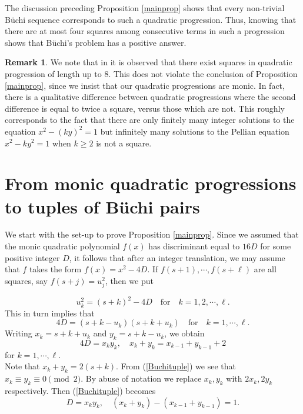 \documentclass[letterpaper,10pt]{amsart}
\theoremstyle{definition}
\newtheorem{remark}[theorem]{Remark}
\numberwithin{equation}{section}
\begin{document}
The discussion preceding Proposition \ref{mainprop} shows that every non-trivial B\"{u}chi sequence corresponds to such a quadratic progression. Thus, knowing that there are at most four squares among consecutive terms in such a progression shows that B\"{u}chi's problem has a positive answer. 

\begin{remark} We note that in \cite{Pin} it is observed that there exist squares in quadratic progression of length up to $8$. This does not violate the conclusion of Proposition \ref{mainprop}, since we insist that our quadratic progressions are monic. In fact, there is a qualitative difference between quadratic progressions where the second difference is equal to twice a square, versus those which are not. This roughly corresponds to the fact that there are only finitely many integer solutions to the equation $x^2 - (ky)^2 = 1$ but infinitely many solutions to the Pellian equation $x^2 - ky^2 = 1$ when $k \geq 2$ is not a square. 
\end{remark} 

\section{From monic quadratic progressions to tuples of B\"{u}chi pairs}
\label{buchpairs} 
	
We start with the set-up to prove Proposition \ref{mainprop}. Since we assumed that the monic quadratic polynomial $f(x)$ has discriminant equal to $16D$ for some positive integer $D$, it follows that after an integer translation, we may assume that $f$ takes the form $f(x) = x^2 - 4D$. If $f(s+1), \cdots, f(s+\ell)$ are all squares, say $f(s+j) = u_j^2$, then we put
	
	\begin{equation} \label{buchseq} u_k^2 = (s+k)^2 -4 D \quad \text{for} \quad k = 1, 2, \cdots, \ell.\end{equation} 
	This in turn implies that 
	\[4D = (s + k - u_k)(s+k + u_k) \quad \text{for} \quad k = 1, \cdots, \ell.\]
	Writing $x_k = s + k + u_k$ and $y_k = s + k - u_k$, we obtain
	\begin{equation} \label{Buchituple} 4D = x_k y_k, \quad x_k + y_k = x_{k-1} + y_{k-1} + 2
 	\end{equation} 
	for $k = 1, \cdots, \ell$.\\
	
	Note that $x_k + y_k = 2(s+k)$. From (\ref{Buchituple}) we see that $x_k \equiv y_k \equiv 0 \pmod{2}$. By abuse of notation we replace $x_k, y_k$ with $2x_k, 2y_k$ respectively. Then (\ref{Buchituple}) becomes
	\begin{equation} \label{Buchituple2} D = x_k y_k, \quad (x_k + y_k) - (x_{k-1} + y_{k-1}) = 1.
	\end{equation}
	
\end{document}
